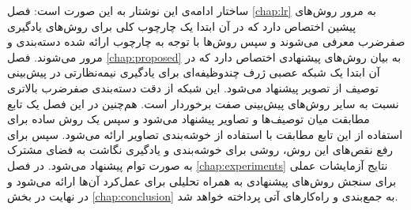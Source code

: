  ساختار ادامه‌ی این نوشتار به این صورت است:  فصل \ref{chap:lr} به مرور روش‌های پیشین اختصاص دارد که در آن ابتدا یک چارچوب کلی برای روش‌های یادگیری صفرضرب معرفی می‌شوند و سپس روش‌ها با توجه به چارچوب ارائه شده دسته‌بندی و مرور می‌شوند. فصل \ref{chap:proposed} به بیان روش‌های پیشنهادی اختصاص دارد که در آن ابتدا یک شبکه عصبی ژرف چندوظیفه‌ای برای یادگیری نیمه‌نظارتی در پیش‌بینی توصیف از تصویر پیشنهاد می‌شود. این شبکه از دقت دسته‌بندی صفرضرب بالاتری نسبت به سایر روش‌های پیش‌بینی صفت برخوردار است. هم‌چنین در این فصل  یک تابع مطابقت میان توصیف‌ها و تصاویر پیشنهاد می‌شود و سپس یک روش ساده برای استفاده از این تابع مطابقت با استفاده از خوشه‌بندی تصاویر ارائه می‌شود. سپس برای رفع نقص‌های این روش، روشی برای خوشه‌بندی و یادگیری نگاشت به فضای مشترک به صورت توام پیشنهاد می‌شود. در فصل
 \ref{chap:experiments}
نتایج آزمایشات عملی برای سنجش روش‌های پیشنهادی به همراه تحلیلی برای عمل‌کرد آن‌ها ارائه می‌شود و در نهایت در بخش \ref{chap:conclusion} به جمع‌بندی و راه‌کارهای آتی پرداخته خواهد شد.
